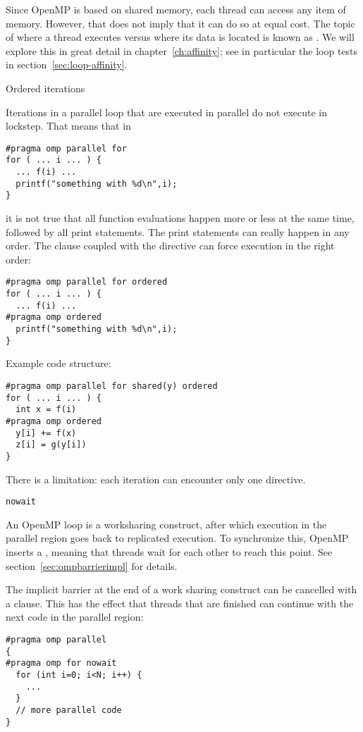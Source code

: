 Since OpenMP is based on shared memory, each thread
can access any item of memory.
However, that does not imply that it can do so at equal cost.
The topic of where a thread executes versus where its data is located
is known as .
We will explore this in great detail in chapter~\ref{ch:affinity};
see in particular the loop tests in section~\ref{sec:loop-affinity}.

 {Ordered iterations}
\label{sec:omp-ordered}

Iterations in a parallel loop that are executed in parallel do not
execute in lockstep. That means that in
\begin{lstlisting}
#pragma omp parallel for
for ( ... i ... ) {
  ... f(i) ...
  printf("something with %d\n",i);
}
\end{lstlisting}
it is not true that all function evaluations happen more or less at
the same time, followed by all print statements. The print statements
can really happen in any order. The  clause
coupled with the  directive can
force execution in the right order:
\begin{lstlisting}
#pragma omp parallel for ordered
for ( ... i ... ) {
  ... f(i) ...
#pragma omp ordered
  printf("something with %d\n",i);
}
\end{lstlisting}
Example code structure:
\begin{lstlisting}
#pragma omp parallel for shared(y) ordered
for ( ... i ... ) {
  int x = f(i)
#pragma omp ordered
  y[i] += f(x)
  z[i] = g(y[i])
}
\end{lstlisting}
There is a limitation:
each iteration can encounter only one  directive.

 {\texttt{nowait}}
\label{sec:omp-nowait}

An OpenMP loop is a worksharing construct,
after which execution in the parallel region goes back
to replicated execution.
To synchronize this, OpenMP inserts a ,
meaning that threads wait for each other to reach this point.
See section~\ref{sec:ompbarrierimpl} for details.

The implicit barrier at the end of a work sharing construct
can be cancelled with a
 clause.
This has the effect that threads that are finished can continue
with the next code in the parallel region:
\begin{lstlisting}
#pragma omp parallel
{
#pragma omp for nowait
  for (int i=0; i<N; i++) {
    ...
  }
  // more parallel code
}
\end{lstlisting}

